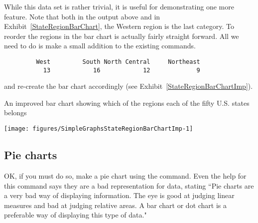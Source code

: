 While this data set is rather trivial, it is useful for demonstrating one more feature. Note that both in the output above and in Exhibit~\ref{StateRegionBarChart}, the Western region is the last category. To reorder the regions in the bar chart is actually fairly straight forward. All we need to do is make a small addition to the existing commands. 
\begin{knitrout}
\color{fgcolor}\begin{kframe}
\begin{alltt}
\hlstd{> }\hlstd{(state.region)[}\hlstd{(}\hlstd{,}\hlstd{,}\hlstd{,}\hlstd{)]}
\end{alltt}
\begin{verbatim}
         West         South North Central     Northeast 
           13            16            12             9 
\end{verbatim}
\end{kframe}
\end{knitrout}
and re-create the bar chart accordingly (see Exhibit~\ref{StateRegionBarChartImp}). 
\begin{exhibit} 
\begin{center} 
\caption{An improved bar chart showing which of the regions each of the fifty U.S. states belongs} 
\label{StateRegionBarChartImp} 
\begin{knitrout}
\color{fgcolor}\begin{kframe}
\begin{alltt}
\hlstd{> }\hlstd{(}\hlstd{(state.region)[}\hlstd{(}\hlstd{,}\hlstd{,}\hlstd{,}\hlstd{)])}
\end{alltt}
\end{kframe}
\texttt{[image: figures/SimpleGraphsStateRegionBarChartImp-1]} 

\end{knitrout}
\end{center} 
\end{exhibit} 
 
\subsection{Pie charts} 
 
OK, if you must do so, make a pie chart using the  command. Even the help for this command says they are a bad representation for data, stating ``Pie charts are a very bad way of displaying information. The eye is good at judging linear measures and bad at judging relative areas. A bar chart or dot chart is a preferable way of displaying this type of data."  
 
